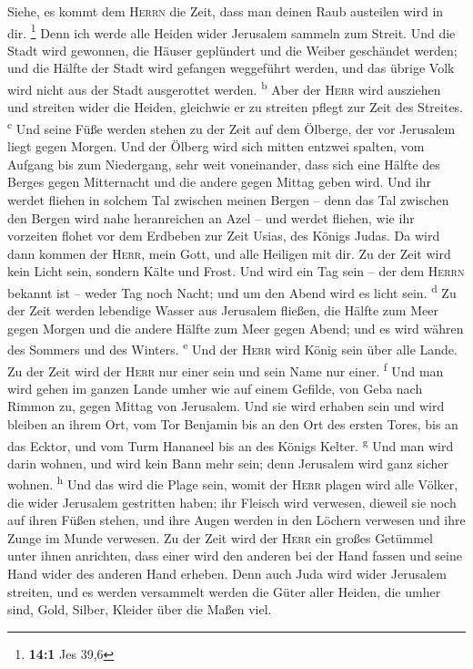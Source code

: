  Siehe, es kommt dem \textsc{Herrn} die Zeit, dass man
deinen Raub austeilen wird in dir. \footnote{\textbf{14:1} Jes 39,6}
 Denn ich werde alle Heiden wider Jerusalem sammeln zum
Streit. Und die Stadt wird gewonnen, die Häuser geplündert und die
Weiber geschändet werden; und die Hälfte der Stadt wird gefangen
weggeführt werden, und das übrige Volk wird nicht aus der Stadt
ausgerottet werden. \textsuperscript{b}  Aber der
\textsc{Herr} wird ausziehen und streiten wider die Heiden, gleichwie er
zu streiten pflegt zur Zeit des Streites. \textsuperscript{c}
 Und seine Füße werden stehen zu der Zeit auf dem Ölberge,
der vor Jerusalem liegt gegen Morgen. Und der Ölberg wird sich mitten
entzwei spalten, vom Aufgang bis zum Niedergang, sehr weit voneinander,
dass sich eine Hälfte des Berges gegen Mitternacht und die andere gegen
Mittag geben wird.  Und ihr werdet fliehen in solchem Tal
zwischen meinen Bergen -- denn das Tal zwischen den Bergen wird nahe
heranreichen an Azel -- und werdet fliehen, wie ihr vorzeiten flohet vor
dem Erdbeben zur Zeit Usias, des Königs Judas. Da wird dann kommen der
\textsc{Herr}, mein Gott, und alle Heiligen mit dir.  Zu
der Zeit wird kein Licht sein, sondern Kälte und Frost. 
Und wird ein Tag sein -- der dem \textsc{Herrn} bekannt ist -- weder Tag
noch Nacht; und um den Abend wird es licht sein. \textsuperscript{d}
 Zu der Zeit werden lebendige Wasser aus Jerusalem
fließen, die Hälfte zum Meer gegen Morgen und die andere Hälfte zum Meer
gegen Abend; und es wird währen des Sommers und des Winters.
\textsuperscript{e}  Und der \textsc{Herr} wird König sein
über alle Lande. Zu der Zeit wird der \textsc{Herr} nur einer sein und
sein Name nur einer. \textsuperscript{f}  Und man wird
gehen im ganzen Lande umher wie auf einem Gefilde, von Geba nach Rimmon
zu, gegen Mittag von Jerusalem. Und sie wird erhaben sein und wird
bleiben an ihrem Ort, vom Tor Benjamin bis an den Ort des ersten Tores,
bis an das Ecktor, und vom Turm Hananeel bis an des Königs Kelter.
\textsuperscript{g}  Und man wird darin wohnen, und wird
kein Bann mehr sein; denn Jerusalem wird ganz sicher wohnen.
\textsuperscript{h}  Und das wird die Plage sein, womit
der \textsc{Herr} plagen wird alle Völker, die wider Jerusalem
gestritten haben; ihr Fleisch wird verwesen, dieweil sie noch auf ihren
Füßen stehen, und ihre Augen werden in den Löchern verwesen und ihre
Zunge im Munde verwesen.  Zu der Zeit wird der
\textsc{Herr} ein großes Getümmel unter ihnen anrichten, dass einer wird
den anderen bei der Hand fassen und seine Hand wider des anderen Hand
erheben.  Denn auch Juda wird wider Jerusalem streiten,
und es werden versammelt werden die Güter aller Heiden, die umher sind,
Gold, Silber, Kleider über die Maßen viel.

